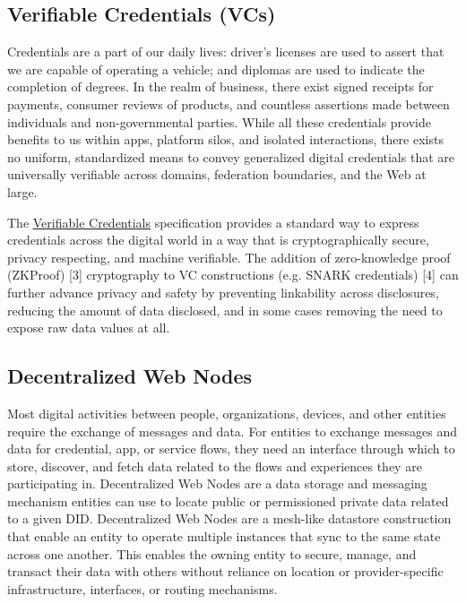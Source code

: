 \documentclass[11pt]{article}
\begin{document}
\subsection{Verifiable Credentials (VCs)}

\vspace{1\baselineskip}
Credentials are a part of our daily lives: driver's licenses are used to assert that we are capable of operating a vehicle; and diplomas are used to indicate the completion of degrees. In the realm of business, there exist signed receipts for payments, consumer reviews of products, and countless assertions made between individuals and non-governmental parties. While all these credentials provide benefits to us within apps, platform silos, and isolated interactions, there exists no uniform, standardized means to convey generalized digital credentials that are universally verifiable across domains, federation boundaries, and the Web at large.

\vspace{1\baselineskip}
The \href{https://www.w3.org/TR/vc-data-model/}{\uline{\textcolor[HTML]{1155CC}{Verifiable Credentials}}} specification provides a standard way to express credentials across the digital world in a way that is cryptographically secure, privacy respecting, and machine verifiable. The addition of zero-knowledge proof (ZKProof) [3] cryptography to VC constructions (e.g. SNARK credentials) [4] can further advance privacy and safety by preventing linkability across disclosures, reducing the amount of data disclosed, and in some cases removing the need to expose raw data values at all.

\vspace{1\baselineskip}
\subsection{Decentralized Web Nodes}

\vspace{1\baselineskip}
Most digital activities between people, organizations, devices, and other entities require the exchange of messages and data. For entities to exchange messages and data for credential, app, or service flows, they need an interface through which to store, discover, and fetch data related to the flows and experiences they are participating in. Decentralized Web Nodes are a data storage and messaging mechanism entities can use to locate public or permissioned private data related to a given DID. Decentralized Web Nodes are a mesh-like datastore construction that enable an entity to operate multiple instances that sync to the same state across one another. This enables the owning entity to secure, manage, and transact their data with others\textcolor[HTML]{202124}{ }without reliance on location or provider-specific infrastructure, interfaces, or routing mechanisms.
\end{document}
